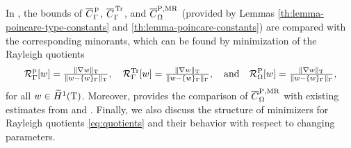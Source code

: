 In \cite[Section 3]{RefArxivMatculevichRepin2015}, 
the bounds of $\overline{C}^{\, \mathrm{p}}_{\Gamma}$, $\overline{C}^{\, \mathrm{Tr}}_{\Gamma}$, and $\overline{C}^{\mathrm{P, MR}}_{\Omega}$
(provided by Lemmas \ref{th:lemma-poincare-type-constants} and 
\ref{th:lemma-poincare-constants}) are compared with the corresponding 
minorants, which can be found by minimization of the Rayleigh quotients
%
\begin{equation}
    \mathcal{R}^{\mathrm{p}}_{\Gamma} [w]
    = \tfrac{\|\nabla w\|_{\T}}{\|w - \{w\}_{\Gamma} \|_{\T}},
    \quad 
    \mathcal{R}^{\mathrm{Tr}}_{\Gamma} [w]
    = \tfrac{\|\nabla w\|_{\T}}{\|w - \{w\}_{\Gamma} \|_{\Gamma}},
		\quad \mathrm{and} \quad
		\mathcal{R}^{\mathrm{P}}_{\Omega} [w]
    = \tfrac{\|\nabla w\|_{\T}}{\|w - \{w\}_{\Gamma} \|_{\Gamma}},		
		\label{eq:quotients}
\end{equation}
%
for all $w \in \widetilde{H}^{1}(\mathrm{T})$. Moreover, \cite{RefArxivMatculevichRepin2015} 
provides the comparison of $\overline{C}^{\mathrm{P, MR}}_{\Omega}$ with
existing estimates from \cite{LaugesenSiudeja2010, LaugesenSiudeja2009} and 
\cite{Cheng1975}. Finally, we also discuss the structure of minimizers for 
Rayleigh quotients \eqref{eq:quotients} and their behavior with respect to 
changing parameters.

